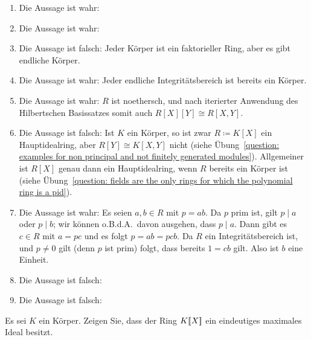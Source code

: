 \begin{solution}
  \begin{enumerate}
    \item
      Die Aussage ist wahr:
    \item
      Die Aussage ist wahr:
    \item
      Die Aussage ist falsch:
      Jeder Körper ist ein faktorieller Ring, aber es gibt endliche Körper.
    \item
      Die Aussage ist wahr:
      Jeder endliche Integritätsbereich ist bereits ein Körper.
    \item
      Die Aussage ist wahr:
      $R$ ist noethersch, und nach iterierter Anwendung des Hilbertschen Basissatzes somit auch $R[X][Y] \cong R[X,Y]$.
    \item
      Die Aussage ist falsch:
      Ist $K$ ein Körper, so ist zwar $R \coloneqq K[X]$ ein Hauptidealring, aber $R[Y] \cong K[X,Y]$ nicht (siehe Übung~\ref{question: examples for non principal and not finitely generated modules}).
      Allgemeiner ist $R[X]$ genau dann ein Hauptidealring, wenn $R$ bereits ein Körper ist (siehe Übung~\ref{question: fields are the only rings for which the polynomial ring is a pid}).
    \item
      Die Aussage ist wahr:
      Es seien $a, b \in R$ mit $p = ab$.
      Da $p$ prim ist, gilt $p \mid a$ oder $p \mid b$;
      wir können o.B.d.A.\ davon ausgehen, dass $p \mid a$.
      Dann gibt es $c \in R$ mit $a = pc$ und es folgt $p = ab = pcb$.
      Da $R$ ein Integritätsbereich ist, und $p \neq 0$ gilt (denn $p$ ist prim) folgt, dass bereits $1 = cb$ gilt.
      Also ist $b$ eine Einheit.
    \item
      Die Aussage ist falsch:
    \item
      Die Aussage ist falsch:
  \end{enumerate}
\end{solution}


\begin{question}
  Es sei $K$ ein Körper.
  Zeigen Sie, dass der Ring $K[\![X]\!]$ ein eindeutiges maximales Ideal besitzt.
\end{question}


